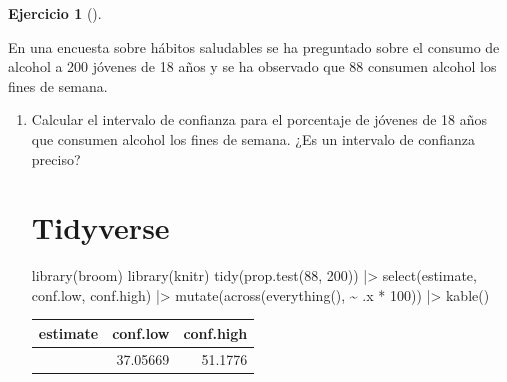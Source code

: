 \documentclass[
  a4paper,
]{scrreport}
\newenvironment{Shaded}{\begin{snugshade}}{\end{snugshade}}
\newcommand{\DecValTok}[1]{\textcolor[rgb]{0.68,0.00,0.00}{#1}}
\newcommand{\FunctionTok}[1]{\textcolor[rgb]{0.28,0.35,0.67}{#1}}
\newcommand{\NormalTok}[1]{\textcolor[rgb]{0.00,0.23,0.31}{#1}}
\newcommand{\SpecialCharTok}[1]{\textcolor[rgb]{0.37,0.37,0.37}{#1}}
\theoremstyle{definition}
\newtheorem{exercise}{Ejercicio}[chapter]
\theoremstyle{remark}
\begin{document}
\begin{exercise}[]\protect\hypertarget{exr-consumo-alcohol-jovenes}{}\label{exr-consumo-alcohol-jovenes}

En una encuesta sobre hábitos saludables se ha preguntado sobre el
consumo de alcohol a 200 jóvenes de 18 años y se ha observado que 88
consumen alcohol los fines de semana.

\begin{enumerate}
\def\labelenumi{\alph{enumi}.}
\item
  Calcular el intervalo de confianza para el porcentaje de jóvenes de 18
  años que consumen alcohol los fines de semana. ¿Es un intervalo de
  confianza preciso?

  \begin{tcolorbox}[enhanced jigsaw, colframe=quarto-callout-tip-color-frame, toprule=.15mm, bottomtitle=1mm, breakable, opacitybacktitle=0.6, toptitle=1mm, colback=white, bottomrule=.15mm, title=\textcolor{quarto-callout-tip-color}{\faLightbulb}\hspace{0.5em}{Solución}, arc=.35mm, left=2mm, titlerule=0mm, rightrule=.15mm, coltitle=black, leftrule=.75mm, opacityback=0, colbacktitle=quarto-callout-tip-color!10!white]

  \section{Tidyverse}

\begin{Shaded}
\begin{Highlighting}[]
\FunctionTok{library}\NormalTok{(broom)}
\FunctionTok{library}\NormalTok{(knitr)}
\FunctionTok{tidy}\NormalTok{(}\FunctionTok{prop.test}\NormalTok{(}\DecValTok{88}\NormalTok{, }\DecValTok{200}\NormalTok{)) }\SpecialCharTok{|\textgreater{}} 
\FunctionTok{select}\NormalTok{(estimate, conf.low, conf.high) }\SpecialCharTok{|\textgreater{}} 
\FunctionTok{mutate}\NormalTok{(}\FunctionTok{across}\NormalTok{(}\FunctionTok{everything}\NormalTok{(), }\SpecialCharTok{\textasciitilde{}}\NormalTok{ .x }\SpecialCharTok{*} \DecValTok{100}\NormalTok{)) }\SpecialCharTok{|\textgreater{}} 
\FunctionTok{kable}\NormalTok{()}
\end{Highlighting}
\end{Shaded}

  \begin{longtable}[]{@{}rrr@{}}
  \toprule\noalign{}
  estimate & conf.low & conf.high \\
  \midrule\noalign{}
  \endhead
  \bottomrule\noalign{}
  \endlastfoot
  44 & 37.05669 & 51.1776 \\
  \end{longtable}


\end{tcolorbox}
\end{enumerate}
\end{exercise}
\end{document}
